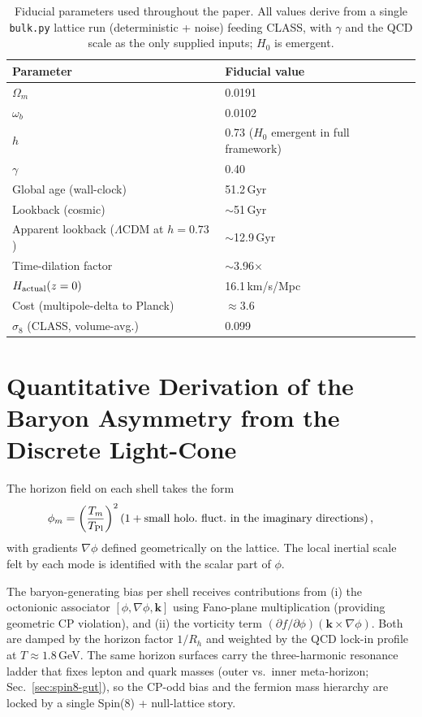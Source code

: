 \documentclass[12pt,a4paper]{article}
\begin{document}
\begin{table}[htbp]
\centering
\small
\begin{tabular}{@{}p{3.6cm}p{4.2cm}@{}}
\toprule
Parameter & Fiducial value \\
\midrule
$\Omega_m$ & 0.0191 \\
$\omega_b$ & 0.0102 \\
$h$ & 0.73 ($H_0$ emergent in full framework) \\
$\gamma$ & 0.40 \\
Global age (wall-clock) & 51.2\,Gyr \\
Lookback (cosmic) & $\sim$51\,Gyr \\
Apparent lookback ($\Lambda$CDM at $h=0.73$) & $\sim$12.9\,Gyr \\
Time-dilation factor & $\sim$3.96$\times$ \\
$H_{\rm actual}(z=0)$ & 16.1\,km/s/Mpc \\
Cost (multipole-delta to Planck) & $\approx 3.6$ \\
$\sigma_8$ (CLASS, volume-avg.) & 0.099 \\
\bottomrule
\end{tabular}
\caption{Fiducial parameters used throughout the paper. All values derive from a single \texttt{bulk.py} lattice run (deterministic + noise) feeding CLASS, with $\gamma$ and the QCD scale as the only supplied inputs; $H_0$ is emergent.}
\label{tab:fiducial}
\end{table}

\section{Quantitative Derivation of the Baryon Asymmetry from the Discrete Light-Cone}

The horizon field on each shell takes the form
\[
\phi_m = \left( \frac{T_m}{T_{\rm Pl}} \right)^2 \left( 1 + \text{small holo.\ fluct.\ in the imaginary directions} \right),
\]
with gradients $\nabla\phi$ defined geometrically on the lattice. The local inertial scale felt by each mode is identified with the scalar part of $\phi$.

The baryon-generating bias per shell receives contributions from (i) the octonionic associator $[\phi, \nabla\phi, \mathbf{k}]$ using Fano-plane multiplication (providing geometric CP violation), and (ii) the vorticity term $(\partial f/\partial\phi)(\mathbf{k} \times \nabla\phi)$. Both are damped by the horizon factor $1/R_h$ and weighted by the QCD lock-in profile at $T \approx 1.8$\,GeV.
The same horizon surfaces carry the three-harmonic resonance ladder that fixes lepton and quark masses (outer vs.\ inner meta-horizon; Sec.~\ref{sec:spin8-gut}), so the CP-odd bias and the fermion mass hierarchy are locked by a single Spin(8) + null-lattice story.
\end{document}
